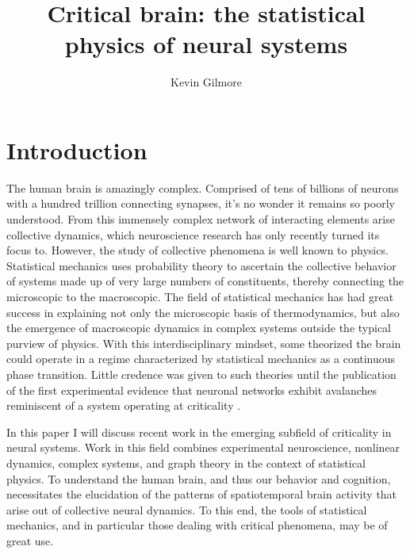\documentclass[12pt]{article}
\title{Critical brain: the statistical physics of neural systems}
\author
{Kevin Gilmore}
\newenvironment{sciabstract}{%
\begin{quote} \bf}
{\end{quote}}
\begin{document}
 


\baselineskip24pt


\maketitle 




\begin{sciabstract}

\end{sciabstract}


\section*{Introduction}

The human brain is amazingly complex. Comprised of tens of billions of neurons with a hundred trillion connecting synapses, it's no wonder it remains so poorly understood. From this immensely complex network of interacting elements arise collective dynamics, which neuroscience research has only recently turned its focus to. However, the study of collective phenomena is well known to physics. Statistical mechanics uses probability theory to ascertain the collective behavior of systems made up of very large numbers of constituents, thereby connecting the microscopic to the macroscopic. The field of statistical mechanics has had great success in explaining not only the microscopic basis of thermodynamics, but also the emergence of macroscopic dynamics in complex systems outside the typical purview of physics. With this interdisciplinary mindset, some theorized the brain could operate in a regime characterized by statistical mechanics as a continuous phase transition\cite{Bak1987a}. Little credence was given to such theories until the publication of the first experimental evidence that neuronal networks exhibit avalanches reminiscent of a system operating at criticality \cite{Beggs2003b}.

In this paper I will discuss recent work in the emerging subfield of criticality in neural systems. Work in this field combines experimental neuroscience, nonlinear dynamics, complex systems, and graph theory in the context of statistical physics. To understand the human brain, and thus our behavior and cognition, necessitates the elucidation of the patterns of spatiotemporal brain activity that arise out of collective neural dynamics. To this end, the tools of statistical mechanics, and in particular those dealing with critical phenomena, may be of great use.
\end{document}

